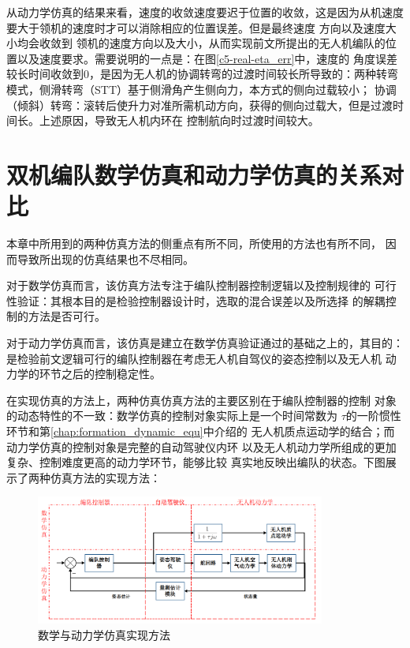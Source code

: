 从动力学仿真的结果来看，速度的收敛速度要迟于位置的收敛，这是因为从机速度要大于领机的速度时才可以消除相应的位置误差。但是最终速度
方向以及速度大小均会收敛到
领机的速度方向以及大小，从而实现前文所提出的无人机编队的位置以及速度要求。需要说明的一点是：在图\ref{c5-real-eta_err}中，速度的
角度误差较长时间收敛到0，是因为无人机的协调转弯的过渡时间较长所导致的：两种转弯模式，侧滑转弯（STT）基于侧滑角产生侧向力，本方式的侧向过载较小；
协调（倾斜）转弯：滚转后使升力对准所需机动方向，获得的侧向过载大，但是过渡时间长。\cite{YuJianQiao2010}上述原因，导致无人机内环在
控制航向时过渡时间较大。

\section{双机编队数学仿真和动力学仿真的关系对比}
本章中所用到的两种仿真方法的侧重点有所不同，所使用的方法也有所不同，
因而导致所出现的仿真结果也不尽相同。

对于数学仿真而言，该仿真方法专注于编队控制器控制逻辑以及控制规律的
可行性验证：其根本目的是检验控制器设计时，选取的混合误差以及所选择
的解耦控制的方法是否可行。

对于动力学仿真而言，该仿真是建立在数学仿真验证通过的基础之上的，其目的：
是检验前文逻辑可行的编队控制器在考虑无人机自驾仪的姿态控制以及无人机
动力学的环节之后的控制稳定性。

在实现仿真的方法上，两种仿真仿真方法的主要区别在于编队控制器的控制
对象的动态特性的不一致：数学仿真的控制对象实际上是一个时间常数为
$\tau$的一阶惯性环节和第\ref{chap:formation_dynamic_equ}中介绍的
无人机质点运动学的结合；而动力学仿真的控制对象是完整的自动驾驶仪内环
以及无人机动力学所组成的更加复杂、控制难度更高的动力学环节，能够比较
真实地反映出编队的状态。下图展示了两种仿真方法的实现方法：
\begin{figure}[H]
    \centering
    \includegraphics[width=0.85\textwidth]{figures/adds/contrust_sim}
    \caption{数学与动力学仿真实现方法}\label{fig:contrust_sim}
\end{figure}

